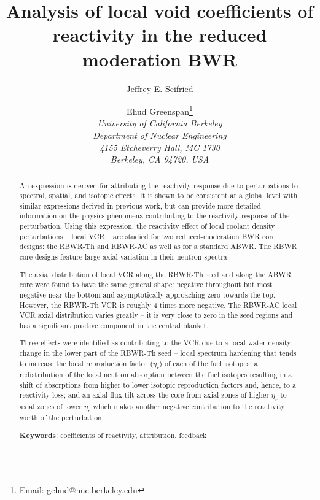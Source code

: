 \documentclass[11pt]{article}
\newcommand{\Keywords}[1]{\vspace{12pt}\par\noindent
{\small{\bf Keywords\/}: #1}}
\begin{document}
\title{Analysis of local void coefficients of reactivity in the reduced moderation BWR}
\author{Jeffrey E. Seifried \and Ehud Greenspan\footnote{Email: gehud@nuc.berkeley.edu}\\
\em University of California Berkeley\\
\em Department of Nuclear Engineering\\
\em 4155 Etcheverry Hall, MC 1730\\
\em Berkeley, CA 94720, USA
}
\date{}
\maketitle

\begin{abstract}
    An expression is derived for attributing the reactivity response due to perturbations to spectral, spatial, and isotopic effects.
    It is shown to be consistent at a global level with similar expressions derived in previous work, but can provide more detailed information on the physics phenomena contributing to the reactivity response of the perturbation.
    Using this expression, the reactivity effect of local coolant density perturbations -- local VCR -- are studied for two reduced-moderation BWR core designs: the RBWR-Th and RBWR-AC as well as for a standard ABWR.
    The RBWR core designs feature large axial variation in their neutron spectra.

    The axial distribution of local VCR along the RBWR-Th seed and along the ABWR core were found to have the same general shape: negative throughout but most negative near the bottom and asymptotically approaching zero towards the top.
    However, the RBWR-Th VCR is roughly 4 times more negative.
    The RBWR-AC local VCR axial distribution varies greatly -- it is very close to zero in the seed regions and has a significant positive component in the central blanket.

    Three effects were identified as contributing to the VCR due to a local water density change in the lower part of the RBWR-Th seed -- local spectrum hardening that tends to increase the local reproduction factor ($\eta_r$) of each of the fuel isotopes; a redistribution of the local neutron absorption between the fuel isotopes resulting in a shift of absorptions from higher to lower isotopic reproduction factors and, hence, to a reactivity loss; and an axial flux tilt across the core from axial zones of higher $\eta_r$ to axial zones of lower $\eta_r$ which makes another negative contribution to the reactivity worth of the perturbation.

    \Keywords{coefficients of reactivity, attribution, feedback}
\end{abstract}
\end{document}

